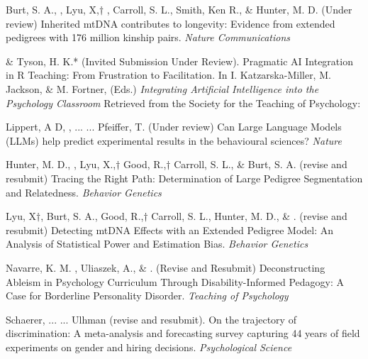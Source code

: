 
\item Burt, S. A., \meb, Lyu, X,$\dagger$ \joe, Carroll, S. L., Smith, Ken R., \& Hunter, M. D. (Under review) Inherited mtDNA contributes to longevity: Evidence from extended pedigrees with 176 million kinship pairs. \textit{Nature Communications}%

\item \meb \& Tyson, H. K.* (Invited Submission Under Review). Pragmatic AI Integration in R Teaching: From Frustration to Facilitation.  In I. Katzarska-Miller, M. Jackson, \& M. Fortner,  (Eds.) \textit{Integrating Artificial Intelligence into the Psychology Classroom} Retrieved from the Society for the Teaching of Psychology: \href{http://teachpsych.org/ebooks/}{\small\color{blue}{teachpsych.org/ebooks/}}

\item Lippert, A D, , ... \meb ... Pfeiffer, T. (Under review) Can Large Language Models (LLMs) help predict experimental results in the behavioural sciences? \textit{Nature}

\item Hunter, M. D., \meb, Lyu, X.,$\dagger$ Good, R.,$\dagger$ Carroll, S. L., \& Burt, S. A. (revise and resubmit) Tracing the Right Path: Determination of Large Pedigree Segmentation and Relatedness. \textit{Behavior Genetics}

\item Lyu, X$\dagger$, Burt, S. A., Good, R.,$\dagger$ Carroll, S. L.,  Hunter, M. D., \& \meb. (revise and resubmit) Detecting mtDNA Effects with an Extended Pedigree Model: An Analysis of Statistical Power and Estimation Bias. %
\textit{Behavior Genetics}

\item Navarre, K. M. \noteB, Uliaszek, A., \& \meb. (Revise and Resubmit) Deconstructing Ableism in Psychology Curriculum Through Disability-Informed Pedagogy: A Case for Borderline Personality Disorder. \textit{Teaching of Psychology}

\item Schaerer, ... \meb ... Ulhman (revise and resubmit). On the trajectory of discrimination: A meta-analysis and forecasting survey capturing 44 years of field experiments on gender and hiring decisions. \textit{Psychological Science}

